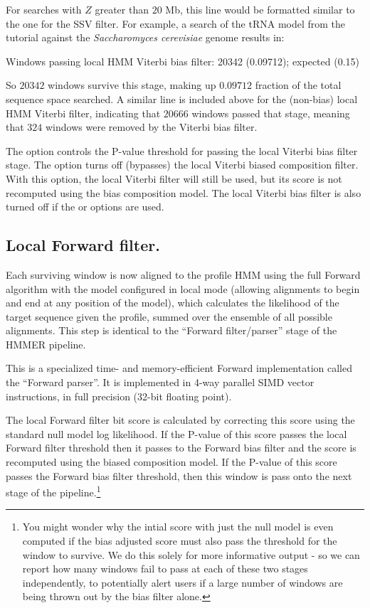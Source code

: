 \begin{sreoutput}
For searches with $Z$ greater than $20$ Mb, this line would be
formatted similar to the one for the SSV filter. For example,
a search of the tRNA model from the tutorial against the
\emph{Saccharomyces cerevisiae} genome results in:

\begin{sreoutput}
Windows   passing  local HMM Viterbi  bias filter:           20342  (0.09712); expected (0.15)
\end{sreoutput}

So $20342$ windows survive this stage, making up $0.09712$ fraction of
the total sequence space searched. A similar line is included above
for the (non-bias) local HMM Viterbi filter, indicating that $20666$
windows passed that stage, meaning that $324$ windows were removed by
the Viterbi bias filter. 

The  option controls the P-value threshold for
passing the local Viterbi bias filter stage.  The 
option turns off (bypasses) the local Viterbi biased composition
filter. With this option, the local Viterbi filter will still be used,
but its score is not recomputed using the bias composition model.  The
local Viterbi bias filter is also turned off if the  or
 options are used.

\subsection{Local Forward filter.}

Each surviving window is now aligned to the profile HMM using the full
Forward algorithm with the model configured in local mode (allowing
alignments to begin and end at any position of the model), which
calculates the likelihood of the target sequence given the profile,
summed over the ensemble of all possible alignments. This step is
identical to the ``Forward filter/parser'' stage of the HMMER
pipeline.

This is a specialized time- and memory-efficient Forward
implementation called the ``Forward parser''. It is implemented in
4-way parallel SIMD vector instructions, in full precision (32-bit
floating point). 

The local Forward filter bit score is calculated by correcting this
score using the standard null model log likelihood. If the P-value of
this score passes the local Forward filter threshold then it passes to
the Forward bias filter and the score is recomputed using the biased
composition model. If the P-value of this score passes the Forward
bias filter threshold, then this window is pass onto the next stage of
the pipeline.\footnote{You might wonder why the intial score with just
the null model is even computed if the bias adjusted score must also
pass the threshold for the window to survive. We do this solely for
more informative output - so we can report how many windows fail to
pass at each of these two stages independently, to potentially alert
users if a large number of windows are being thrown out by the bias
filter alone.} 


\end{sreoutput}
